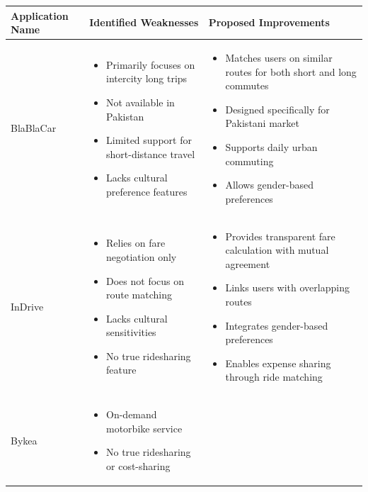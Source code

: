 \begin{table}[htbp]
\begin{tabularx}{\textwidth}{|p{3cm}|X|X|}
\hline
\textbf{Application Name} & \textbf{Identified Weaknesses} & \textbf{Proposed Improvements} \\
\hline
BlaBlaCar &
\begin{itemize}[leftmargin=*, noitemsep, topsep=0pt]
    \item Primarily focuses on intercity long trips
    \item Not available in Pakistan
    \item Limited support for short-distance travel
    \item Lacks cultural preference features
\end{itemize}
&
\begin{itemize}[leftmargin=*, noitemsep, topsep=0pt]
    \item Matches users on similar routes for both short and long commutes
    \item Designed specifically for Pakistani market
    \item Supports daily urban commuting
    \item Allows gender-based preferences
\end{itemize}
\\
\hline
InDrive &
\begin{itemize}[leftmargin=*, noitemsep, topsep=0pt]
    \item Relies on fare negotiation only
    \item Does not focus on route matching
    \item Lacks cultural sensitivities
    \item No true ridesharing feature
\end{itemize}
&
\begin{itemize}[leftmargin=*, noitemsep, topsep=0pt]
    \item Provides transparent fare calculation with mutual agreement
    \item Links users with overlapping routes
    \item Integrates gender-based preferences
    \item Enables expense sharing through ride matching
\end{itemize}
\\
\hline
Bykea &
\begin{itemize}[leftmargin=*, noitemsep, topsep=0pt]
    \item On-demand motorbike service
    \item No true ridesharing or cost-sharing

\end{itemize}
\end{tabularx}
\end{table}
